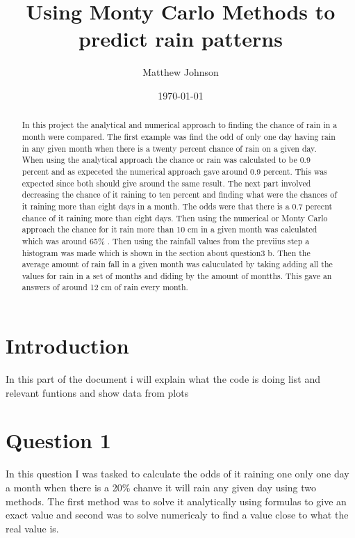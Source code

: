 \documentclass[twocolumn]{revtex4}
\begin{document}
\title{Using Monty Carlo Methods to predict rain patterns}

\author{Matthew Johnson}

\date{\today}

\begin{abstract}
   

In this project the analytical and numerical approach to finding the chance of rain in a month were compared. The first example was find the odd of only one day having rain in any given month when there is a twenty percent chance of rain on a given day. When using the analytical approach the chance or rain was calculated to be 0.9 percent and as expeceted the numerical approach gave around 0.9 percent. This was expected since both should give around the same result. The next part involved decreasing the chance of it raining to ten percent and finding what were the chances of it raining more than eight days in a month. The odds were that there is a 0.7 perecnt chance of it raining more than eight days.   Then using the numerical or Monty Carlo approach the chance for it rain more than 10 cm in a given month  was calculated which was around 65$\%$  .  Then using the rainfall values from the previius step a histogram was made which is shown in the section about question3 b. Then the average amount of rain fall in a given month was caluculated by taking adding all the values for rain in a set of months and diding by the amount of montths. This gave an answers of around 12 cm of rain every month.
\end{abstract}

\maketitle

\section{Introduction}
In this part of the document i will explain what the code is doing list and relevant funtions and show data from plots
\section{Question 1}
In this question I was tasked to calculate the odds of it raining one only one day a month when there is a 20$\%$ chanve it will rain any given day using two methods. The first method was to solve it analytically using formulas to give an exact value and second was to solve numericaly to find a value close to what the real value is. 
\end{document}
